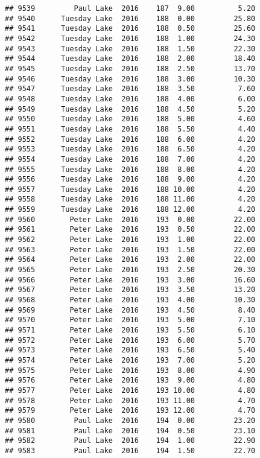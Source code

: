 \documentclass[
]{article}
\begin{document}
\begin{verbatim}
## 9539         Paul Lake  2016    187  9.00          5.20
## 9540      Tuesday Lake  2016    188  0.00         25.80
## 9541      Tuesday Lake  2016    188  0.50         25.60
## 9542      Tuesday Lake  2016    188  1.00         24.30
## 9543      Tuesday Lake  2016    188  1.50         22.30
## 9544      Tuesday Lake  2016    188  2.00         18.40
## 9545      Tuesday Lake  2016    188  2.50         13.70
## 9546      Tuesday Lake  2016    188  3.00         10.30
## 9547      Tuesday Lake  2016    188  3.50          7.60
## 9548      Tuesday Lake  2016    188  4.00          6.00
## 9549      Tuesday Lake  2016    188  4.50          5.20
## 9550      Tuesday Lake  2016    188  5.00          4.60
## 9551      Tuesday Lake  2016    188  5.50          4.40
## 9552      Tuesday Lake  2016    188  6.00          4.20
## 9553      Tuesday Lake  2016    188  6.50          4.20
## 9554      Tuesday Lake  2016    188  7.00          4.20
## 9555      Tuesday Lake  2016    188  8.00          4.20
## 9556      Tuesday Lake  2016    188  9.00          4.20
## 9557      Tuesday Lake  2016    188 10.00          4.20
## 9558      Tuesday Lake  2016    188 11.00          4.20
## 9559      Tuesday Lake  2016    188 12.00          4.20
## 9560        Peter Lake  2016    193  0.00         22.00
## 9561        Peter Lake  2016    193  0.50         22.00
## 9562        Peter Lake  2016    193  1.00         22.00
## 9563        Peter Lake  2016    193  1.50         22.00
## 9564        Peter Lake  2016    193  2.00         22.00
## 9565        Peter Lake  2016    193  2.50         20.30
## 9566        Peter Lake  2016    193  3.00         16.60
## 9567        Peter Lake  2016    193  3.50         13.20
## 9568        Peter Lake  2016    193  4.00         10.30
## 9569        Peter Lake  2016    193  4.50          8.40
## 9570        Peter Lake  2016    193  5.00          7.10
## 9571        Peter Lake  2016    193  5.50          6.10
## 9572        Peter Lake  2016    193  6.00          5.70
## 9573        Peter Lake  2016    193  6.50          5.40
## 9574        Peter Lake  2016    193  7.00          5.20
## 9575        Peter Lake  2016    193  8.00          4.90
## 9576        Peter Lake  2016    193  9.00          4.80
## 9577        Peter Lake  2016    193 10.00          4.80
## 9578        Peter Lake  2016    193 11.00          4.70
## 9579        Peter Lake  2016    193 12.00          4.70
## 9580         Paul Lake  2016    194  0.00         23.20
## 9581         Paul Lake  2016    194  0.50         23.10
## 9582         Paul Lake  2016    194  1.00         22.90
## 9583         Paul Lake  2016    194  1.50         22.70

\end{verbatim}
\end{document}
